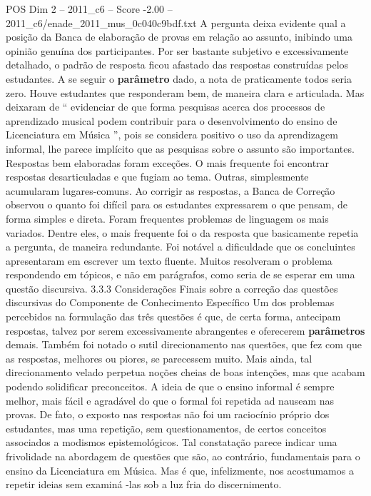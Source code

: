 \begin{textsample}{POS Dim 2 – 2011\_c6 – Score -2.00 – 2011\_c6/enade\_2011\_mus\_0c040c9bdf.txt}
A pergunta deixa evidente qual a posição da Banca de elaboração de provas em relação ao assunto, inibindo uma opinião genuína dos participantes.
Por ser bastante subjetivo e excessivamente detalhado, o padrão de resposta ficou afastado das respostas construídas pelos estudantes.
A se seguir o \textbf{parâmetro} dado, a nota de praticamente todos seria zero.
Houve estudantes que responderam bem, de maneira clara e articulada.
Mas deixaram de “ evidenciar de que forma pesquisas acerca dos processos de aprendizado musical podem contribuir para o desenvolvimento do ensino de Licenciatura em Música ”, pois se considera positivo o uso da aprendizagem informal, lhe parece implícito que as pesquisas sobre o assunto são importantes.
Respostas bem elaboradas foram exceções.
O mais frequente foi encontrar respostas desarticuladas e que fugiam ao tema.
Outras, simplesmente acumularam lugares-comuns.
Ao corrigir as respostas, a Banca de Correção observou o quanto foi difícil para os estudantes expressarem o que pensam, de forma simples e direta.
Foram frequentes problemas de linguagem os mais variados.
Dentre eles, o mais frequente foi o da resposta que basicamente repetia a pergunta, de maneira redundante.
Foi notável a dificuldade que os concluintes apresentaram em escrever um texto fluente.
Muitos resolveram o problema respondendo em tópicos, e não em parágrafos, como seria de se esperar em uma questão discursiva. 3.3.3 Considerações Finais sobre a correção das questões discursivas do Componente de Conhecimento Específico Um dos problemas percebidos na formulação das três questões é que, de certa forma, antecipam respostas, talvez por serem excessivamente abrangentes e oferecerem \textbf{parâmetros} demais.
Também foi notado o sutil direcionamento nas questões, que fez com que as respostas, melhores ou piores, se parecessem muito.
Mais ainda, tal direcionamento velado perpetua noções cheias de boas intenções, mas que acabam podendo solidificar preconceitos.
A ideia de que o ensino informal é sempre melhor, mais fácil e agradável do que o formal foi repetida ad nauseam nas provas.
De fato, o exposto nas respostas não foi um raciocínio próprio dos estudantes, mas uma repetição, sem questionamentos, de certos conceitos associados a modismos epistemológicos.
Tal constatação parece indicar uma frivolidade na abordagem de questões que são, ao contrário, fundamentais para o ensino da Licenciatura em Música.
Mas é que, infelizmente, nos acostumamos a repetir ideias sem examiná -las sob a luz fria do discernimento.

\end{textsample}
